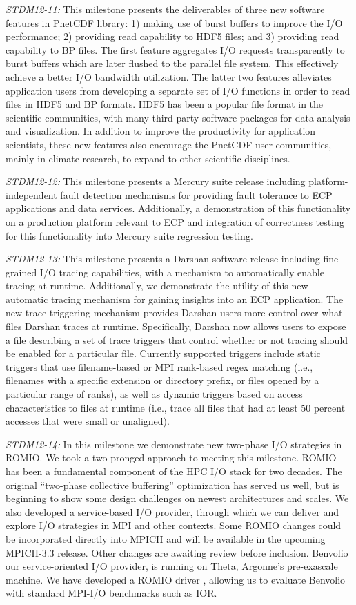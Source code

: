 \emph{STDM12-11:}
This milestone presents the deliverables of three new software features
in PnetCDF library: 1) making use of burst buffers to improve the
I/O performance; 2) providing read capability to HDF5 files; and 3)
providing read capability to BP files. The first feature aggregates
I/O requests transparently to burst buffers which are later flushed
to the parallel file system. This effectively achieve a better I/O
bandwidth utilization. The latter two features alleviates application
users from developing a separate set of I/O functions in order to read
files in HDF5 and BP formats. HDF5 has been a popular file format in the
scientific communities, with many third-party software packages for data
analysis and visualization. In addition to improve the productivity for
application scientists, these new features also encourage the PnetCDF user
communities, mainly in climate research, to expand to other scientific
disciplines.

\emph{STDM12-12:}
This milestone presents a Mercury suite release including
platform-independent fault detection mechanisms for providing fault
tolerance to ECP applications and data services. Additionally, a
demonstration of this functionality on a production platform relevant
to ECP and integration of correctness testing for this functionality
into Mercury suite regression testing.

\emph{STDM12-13:}
This milestone presents a Darshan software release including fine-grained
I/O tracing capabilities, with a mechanism to automatically enable tracing
at runtime. Additionally, we demonstrate the utility of this new automatic
tracing mechanism for gaining insights into an ECP application. The new
trace triggering mechanism provides Darshan users more control over
what files Darshan traces at runtime. Specifically, Darshan now allows
users to expose a file describing a set of trace triggers that control
whether or not tracing should be enabled for a particular file. Currently
supported triggers include static triggers that use filename-based or
MPI rank-based regex matching (i.e., filenames with a specific extension
or directory prefix, or files opened by a particular range of ranks),
as well as dynamic triggers based on access characteristics to files at
runtime (i.e., trace all files that had at least 50 percent accesses that were
small or unaligned).  

\emph{STDM12-14:}
In this milestone we demonstrate new two-phase I/O strategies in ROMIO. 
We took a two-pronged approach to meeting this milestone. ROMIO has been a
fundamental component of the HPC I/O stack for two decades. The original
“two-phase collective buffering” optimization has served us well,
but is beginning to show some design challenges on newest architectures
and scales. We also developed a service-based I/O provider, through which
we can deliver and explore I/O strategies in MPI and other contexts. 
Some ROMIO changes could be incorporated directly into MPICH and will be
available in the upcoming MPICH-3.3 release. Other changes are awaiting
review before inclusion. Benvolio  our service-oriented I/O provider,
is running on Theta, Argonne’s pre-exascale machine. We have developed
a ROMIO  driver , allowing us to evaluate Benvolio with standard MPI-I/O
benchmarks such as IOR. 

